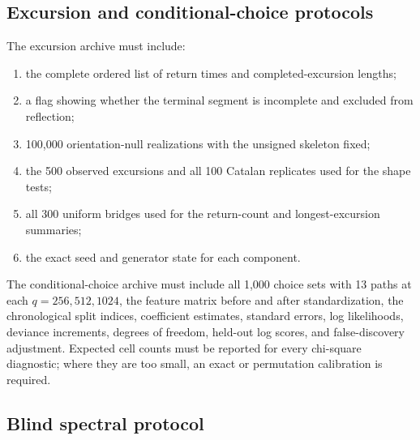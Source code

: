 \documentclass[11pt,reqno]{amsart}
\numberwithin{equation}{section}
\theoremstyle{plain}
\theoremstyle{definition}
\theoremstyle{remark}
\begin{document}
\subsection{Excursion and conditional-choice protocols}
\label{subsec:secondary-protocols}

The excursion archive must include:
\begin{enumerate}[label=(\alph*)]
\item the complete ordered list of return times and completed-excursion
lengths;
\item a flag showing whether the terminal segment is incomplete and excluded
from reflection;
\item 100,000 orientation-null realizations with the unsigned skeleton fixed;
\item the 500 observed excursions and all 100 Catalan replicates used for the
shape tests;
\item all 300 uniform bridges used for the return-count and longest-excursion
summaries;
\item the exact seed and generator state for each component.
\end{enumerate}

The conditional-choice archive must include all 1,000 choice sets with 13
paths at each \(q=256,512,1024\), the feature matrix before and after
standardization, the chronological split indices, coefficient estimates,
standard errors, log likelihoods, deviance increments, degrees of freedom,
held-out log scores, and false-discovery adjustment.  Expected cell counts
must be reported for every chi-square diagnostic; where they are too small,
an exact or permutation calibration is required.

\subsection{Blind spectral protocol}
\label{subsec:blind-spectral-protocol}
\end{document}
